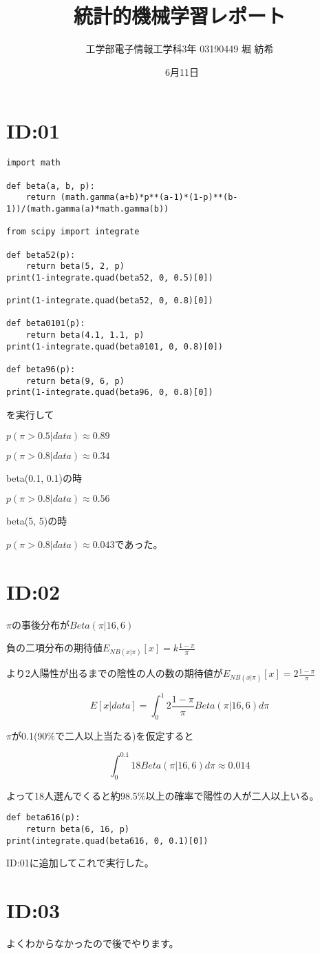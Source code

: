 \documentclass[dvipdfmx]{jsarticle}
\begin{document}
\title{統計的機械学習レポート}
\author{工学部電子情報工学科3年 03190449  堀 紡希}
\date{\ 6月11日}
\maketitle

\section{ID:01}

\begin{verbatim}
import math

def beta(a, b, p):
    return (math.gamma(a+b)*p**(a-1)*(1-p)**(b-1))/(math.gamma(a)*math.gamma(b))

from scipy import integrate

def beta52(p):
    return beta(5, 2, p)
print(1-integrate.quad(beta52, 0, 0.5)[0])

print(1-integrate.quad(beta52, 0, 0.8)[0])

def beta0101(p):
    return beta(4.1, 1.1, p)
print(1-integrate.quad(beta0101, 0, 0.8)[0])

def beta96(p):
    return beta(9, 6, p)
print(1-integrate.quad(beta96, 0, 0.8)[0])
\end{verbatim}


を実行して

$p(\pi>0.5 | data) \approx  0.89$

$p(\pi>0.8 | data) \approx  0.34$

beta(0.1, 0.1)の時

$p(\pi>0.8 | data) \approx  0.56$

beta(5, 5)の時

$p(\pi>0.8 | data) \approx  0.043$であった。

\section{ID:02}


$\pi$の事後分布が$Beta(\pi|16, 6)$

負の二項分布の期待値$E_{NB(x|\pi)}[x] = k\frac{1-\pi}{\pi}$

より2人陽性が出るまでの陰性の人の数の期待値が$E_{NB(x|\pi)}[x] = 2\frac{1-\pi}{\pi}$


\[E[x|data] = \int_{0}^{1}2\frac{1-\pi}{\pi}Beta(\pi|16, 6)d\pi\]

$\pi$が0.1(90\%で二人以上当たる)を仮定すると

\[ \int^{0.1}_{0} 18 Beta(\pi | 16, 6)d\pi \approx 0.014\]


よって18人選んでくると約98.5\%以上の確率で陽性の人が二人以上いる。

\begin{verbatim}
def beta616(p):
    return beta(6, 16, p)
print(integrate.quad(beta616, 0, 0.1)[0])
\end{verbatim}

ID:01に追加してこれで実行した。
\section{ID:03}


よくわからなかったので後でやります。
\end{document}
